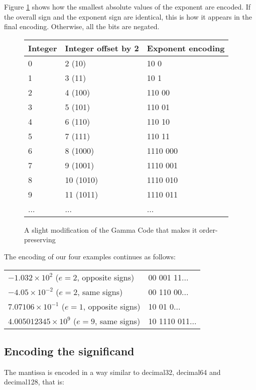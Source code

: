 \documentclass{acm_proc_article-sp}
\begin{document}
Figure \ref{figure-exponent-encoding} shows how the smallest absolute values of the exponent are encoded. If the overall sign and the exponent sign are identical, this is how it appears in the final encoding. Otherwise, all the bits are negated.

\begin{figure}
\caption{A slight modification of the Gamma Code that makes it order-preserving}
\label{figure-exponent-encoding}
\center
\begin{tabular}{|l|l|l|}
\hline
Integer & Integer offset by 2 & Exponent encoding\\
\hline
0 & 2 (10) & 10 0 \\
\hline
1 & 3 (11) & 10 1  \\
\hline
2 & 4 (100) & 110 00  \\
\hline
3 & 5 (101) & 110 01 \\
\hline
4 & 6 (110) & 110 10 \\
\hline
5 & 7 (111) & 110 11 \\
\hline
6 & 8 (1000) & 1110 000 \\
\hline
7 & 9 (1001) & 1110 001 \\
\hline
8 & 10 (1010) & 1110 010 \\
\hline
9 & 11 (1011) & 1110 011 \\
\hline
... & ... & ...\\
\hline
\end{tabular}
\end{figure}

The encoding of our four examples continues as follows:

\begin{tabular}{l|l}
$- 1.032 \times 10^2$ ($e=2$, opposite signs) & 00 001 11... \\

$-4.05 \times 10^{-2}$ ($e=2$, same signs) & 00 110 00... \\

$7.07106 \times 10^{-1}$ ($e=1$, opposite signs) & 10 01 0... \\

$4.005012345 \times 10^9$ ($e=9$, same signs) & 10 1110 011...\\
\end{tabular}


\subsection{Encoding the significand}

The mantissa is encoded in a way similar to decimal32, decimal64 and decimal128, that is:
\end{document}
